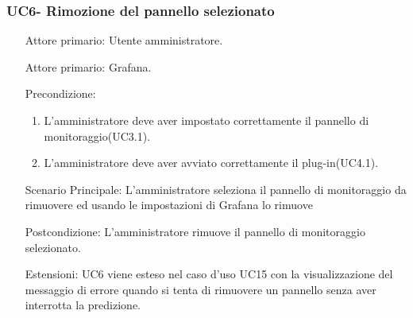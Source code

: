 \subsubsection{UC6- Rimozione del pannello selezionato}
\label{sssec:uc6}
\begin{description}
	\begin{enumerate}
		\item[Attore primario:] Utente amministratore.
		\item[Attore primario:] Grafana.
		\item[Precondizione:]
		\begin{enumerate}
			\item L'amministratore deve aver impostato correttamente il pannello di monitoraggio(UC3.1).
			\item L'amministratore deve aver avviato correttamente il plug-in(UC4.1).
		\end{enumerate}		
		\item[Scenario Principale:] L'amministratore seleziona il pannello di monitoraggio da rimuovere ed usando le impostazioni di Grafana lo rimuove
		\item[Postcondizione:] L'amministratore rimuove il pannello di monitoraggio selezionato.
		\item[Estensioni:] UC6 viene esteso nel caso d'uso UC15 con la visualizzazione del messaggio di errore quando si tenta di rimuovere un pannello senza aver interrotta la predizione.
	\end{enumerate}
\end{description}